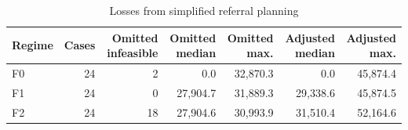 \begin{table}[ht]
\centering\footnotesize
\caption{Losses from simplified referral planning}\label{tab:transfer}
\begin{tabular}{@{}lrrrrrr@{}}\toprule
Regime & Cases & Omitted infeasible & Omitted median & Omitted max. & Adjusted median & Adjusted max.\\\midrule
F0 & 24 & 2 & 0.0 & 32,870.3 & 0.0 & 45,874.4\\
F1 & 24 & 0 & 27,904.7 & 31,889.3 & 29,338.6 & 45,874.5\\
F2 & 24 & 18 & 27,904.6 & 30,993.9 & 31,510.4 & 52,164.6\\
\bottomrule\end{tabular}
\end{table}
